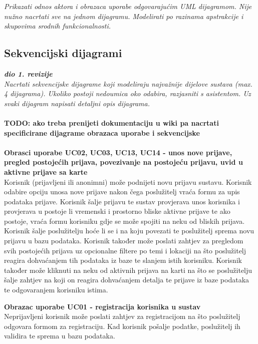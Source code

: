 					\textit{Prikazati odnos aktora i obrazaca uporabe odgovarajućim UML dijagramom. Nije nužno nacrtati sve na jednom dijagramu. Modelirati po razinama apstrakcije i skupovima srodnih funkcionalnosti.}
				\eject		
				
			\subsection{Sekvencijski dijagrami}
				
				\textbf{\textit{dio 1. revizije}}\\
				
				
				\textit{Nacrtati sekvencijske dijagrame koji modeliraju najvažnije dijelove sustava (max. 4 dijagrama). Ukoliko postoji nedoumica oko odabira, razjasniti s asistentom. Uz svaki dijagram napisati detaljni opis dijagrama.}
				\\
				\\
				\textbf{TODO: ako treba prenijeti dokumentaciju u wiki pa nacrtati specificirane dijagrame obrazaca uporabe i sekvencijske}
				\\
				\\
				\textbf{Obrasci uporabe UC02, UC03, UC13, UC14 - unos nove prijave, pregled postojećih prijava, povezivanje na postojeću prijavu, uvid u aktivne prijave sa karte}\\
				Korisnik (prijavljeni ili anonimni) može podnijeti novu prijavu sustavu. Korisnik odabire opciju unosa nove prijave nakon čega poslužitelj vraća formu za upis podataka prijave. 
				Korisnik šalje prijavu te sustav provjerava unos korisnika i provjerava u postoje li vremenski i prostorno bliske aktivne prijave te ako postoje, vraća formu korisniku gdje se može spojiti na neku od bliskih prijava. 
				Korisnik šalje poslužitelju hoće li se i na koju povezati te poslužitelj sprema novu prijavu u bazu podataka. Korisnik također može poslati zahtjev za pregledom svih postojećih prijava uz opcionalne filtere po temi i lokaciji na što poslužitelj reagira dohvaćanjem tih podataka iz baze te slanjem istih korisniku. 
				Korisnik također može kliknuti na neku od aktivnih prijava na karti na što se poslužitelju šalje zahtjev na koji on reagira dohvaćanjem detalja te prijave iz baze podataka te odgovaranjem korisniku istima.
				
				
				\textbf{Obrazac uporabe UC01 - registracija korisnika u sustav}\\
				Neprijavljeni korisnik može poslati zahtjev za registracijom na što poslužitelj odgovara formom za registraciju. Kad korisnik pošalje podatke, poslužitelj ih validira te sprema u bazu podataka.


